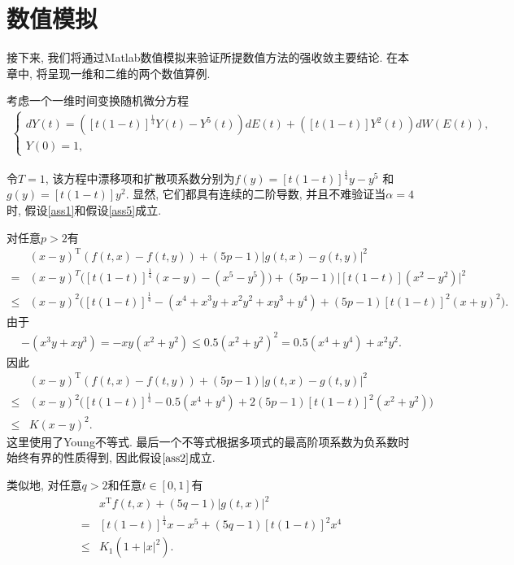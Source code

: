 

\chapter{数值模拟}

接下来, 我们将通过Matlab数值模拟来验证所提数值方法的强收敛主要结论. 在本章中, 将呈现一维和二维的两个数值算例.
\begin{example}\label{ex}
    考虑一个一维时间变换随机微分方程
    \begin{align}\label{ex1}
        \left\{
        \begin{array}{lr}
            dY(t)=\left([t(1-t)]^{\frac{1}{4}}Y(t)-Y^5(t)\right)dE(t)+\left([t(1-t)]Y^2(t)\right)dW(E(t)),&\\
            Y(0)=1,&
        \end{array}
        \right.
    \end{align}
\end{example}
令$T=1$, 该方程中漂移项和扩散项系数分别为$f(y)=[t(1-t)]^{\frac{1}{4}}y-y^5$ 和 $g(y)=[t(1-t)]y^2$. 显然, 它们都具有连续的二阶导数, 并且不难验证当$\alpha =4$时,
假设\ref{ass1}和假设\ref{ass5}成立.
\par
对任意$p>2$有
\begin{align*}
    &(x-y)^{\mathrm{T}}(f(t,x)-f(t,y))+(5p-1)|g(t,x)-g(t,y)|^2\\
   =&(x-y)^T\bigg([t(1-t)]^{\frac{1}{4}}(x-y)-(x^5-y^5)\bigg)+(5p-1)\big|[t(1-t)](x^2-y^2)\big|^{2}\\
    \leq&
    (x-y)^2\bigg([t(1-t)]^{\frac{1}{4}}-(x^4+x^{3}y+x^{2}y^{2}+xy^{3}+y^4)+(5p-1)[t(1-t)]^{2}(x+y)^{2}\bigg).
\end{align*}
由于
\begin{align*}
    -(x^{3}y+xy^{3})=-xy(x^{2}+y^{2})\leq 0.5(x^{2}+y^{2})^{2}=0.5(x^{4}+y^{4})+x^{2}y^{2}.
\end{align*}
因此
\begin{align*}
    &(x-y)^{\mathrm{T}}(f(t,x)-f(t,y))+(5p-1)|g(t,x)-g(t,y)|^2\\
    \leq&(x-y)^2\bigg([t(1-t)]^{\frac{1}{4}}-0.5(x^4+y^4)+2(5p-1)[t(1-t)]^{2}(x^{2}+y^{2})\bigg)\\
    \leq& K(x-y)^{2}.
\end{align*}
这里使用了Young不等式. 最后一个不等式根据多项式的最高阶项系数为负系数时始终有界的性质得到, 因此假设$\ref{ass2}$成立.
\par
类似地, 对任意$q>2$和任意$t\in [0,1]$有
\begin{align*}
    & x^{\mathrm{T}}f(t,x)+(5q-1)|g(t,x)|^2\\
    =& [t(1-t)]^{\frac{1}{4}}x-x^5+(5q-1)[t(1-t)]^{2}x^4\\
    \leq & K_{1}(1+|x|^2).
\end{align*}
